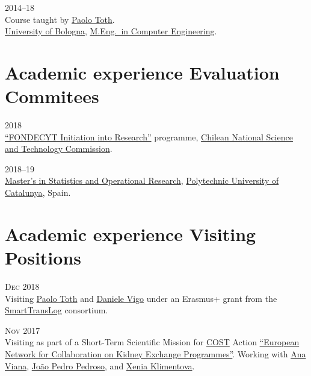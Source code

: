 \begin{paracol}{2}
  \textsc{2014--18}
\switchcolumn
  \\
  Course taught by \href{https://scholar.google.com/citations?user=2IPL4XIAAAAJ}{Paolo Toth}.\\
  \href{https://www.unibo.it}{University of Bologna}, \href{https://corsi.unibo.it/magistrale/ingegneriainformatica}{M.Eng.\ in Computer Engineering}.
\end{paracol}

\section*{Academic experience {\small Evaluation Commitees}}

\begin{paracol}{2}
  \textsc{2018}
\switchcolumn
  \\
  \href{http://www.conicyt.cl/fondecyt/fondecyt-program/}{``FONDECYT Initiation into Research''} programme, \href{http://www.conicyt.cl/}{Chilean National Science and Technology Commission}.
\end{paracol}

\begin{paracol}{2}
  \textsc{2018--19}
\switchcolumn
  \\
  \href{https://mesioupcub.masters.upc.edu/en}{Master's in Statistics and Operational Research}, \href{https://www.upc.edu/en}{Polytechnic University of Catalunya}, Spain.
\end{paracol}

\section*{Academic experience {\small Visiting Positions}}

\begin{paracol}{2}
  \textsc{Dec 2018}
\switchcolumn
  \\
  Visiting \href{https://scholar.google.it/citations?user=2IPL4XIAAAAJ}{Paolo Toth} and \href{https://scholar.google.com/citations?user=2kk8d_AAAAAJ}{Daniele Vigo} under an Erasmus+ grant from the \href{https://smarttranslog.wordpress.com/}{SmartTransLog} consortium.
\end{paracol}

\begin{paracol}{2}
  \textsc{Nov 2017}
\switchcolumn
  \\
  Visiting as part of a Short-Term Scientific Mission for \href{http://www.cost.eu/}{COST} Action \href{http://www.enckep-cost.eu/}{``European Network for Collaboration on Kidney Exchange Programmes''}.
  Working with \href{https://scholar.google.com/citations?user=RW7QevYAAAAJ}{Ana Viana}, \href{https://scholar.google.it/citations?user=aWTZf_AAAAAJ}{João Pedro Pedroso}, and \href{http://orcid.org/0000-0003-1085-0810}{Xenia Klimentova}.
\end{paracol}

